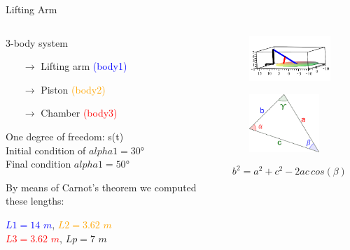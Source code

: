 \documentclass{beamer}              %
\begin{document}
	\begin{frame}{Lifting Arm}
		\footnotesize 
		\begin{columns}
			\begin{column}{0.6\textwidth}
				\begin{block}{3-body system}
					\begin{itemize}
						\item[$\rightarrow$] Lifting arm \textcolor{blue}{(body1)}
						\item[$\rightarrow$] Piston \textcolor{orange}{(body2)}
						\item[$\rightarrow$] Chamber \textcolor{red}{(body3)}
					\end{itemize}
				\end{block}
				
				\medskip
				
				One degree of freedom: s(t) \\
				Initial condition of $alpha1=30$° \\
				Final condition $alpha1=50$° \\
				
				\medskip
				
				By means of Carnot's theorem we computed these lengths:
				
				\textcolor{blue}{$L1=14$ $m$},	
				\textcolor{orange}{$L2=3.62$ $m$}\\
				\textcolor{red}{$L3 = 3.62$ $m$}, $Lp = 7$ $m$\\
			\end{column}
			\begin{column}{0.4\textwidth}		
				\begin{figure}
					\includegraphics[width=125pt]{grafici/liftarm_initialpos.png}
				\end{figure}
				\begin{figure}
					\includegraphics[width=75pt]{immagini/teorema_carnot.png}
				\end{figure}
			    \begin{equation*}
			     b^2=a^2+c^2-2ac\,cos(\beta)
			    \end{equation*}
			\end{column}	
		\end{columns}
	\end{frame}
\end{document}
